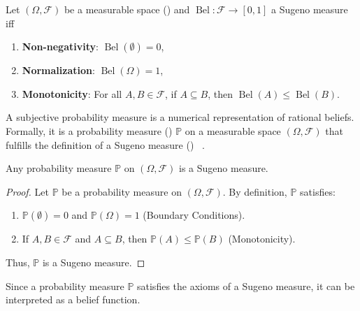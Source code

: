 \begin{definition}
	\label{def:sugeno_measure}
	Let $(\Omega, \mathcal{F})$ be a measurable space () and $\operatorname{Bel}: \mathcal{F} \to [0, 1]$ a Sugeno measure iff~\cite{shafer1987}
	\begin{enumerate}
		\item \textbf{Non-negativity}: $\operatorname{Bel}(\emptyset) = 0$,
		\item \textbf{Normalization}: $\operatorname{Bel}(\Omega) = 1$,
		\item \textbf{Monotonicity}: For all $A, B \in \mathcal{F}$, if $A \subseteq B$, then $\operatorname{Bel}(A) \leq \operatorname{Bel}(B)$.
	\end{enumerate}
\end{definition}

\begin{definition}
	\label{def:subjective_probability}
	A subjective probability measure is a numerical representation of rational beliefs. Formally, it is a probability measure () $\mathbb{P}$ on a measurable space $(\Omega, \mathcal{F})$ that fulfills the definition of a Sugeno measure () ~\cite{shafer1987,hoff2009first}.
\end{definition}

\begin{theorem}
	Any probability measure $\mathbb{P}$ on $(\Omega, \mathcal{F})$ is a Sugeno measure.
\end{theorem}
\begin{proof}
	Let $\mathbb{P}$ be a probability measure on $(\Omega, \mathcal{F})$. By definition, $\mathbb{P}$ satisfies:
	\begin{enumerate}
		\item $\mathbb{P}(\emptyset) = 0$ and $\mathbb{P}(\Omega) = 1$ (Boundary Conditions).
		\item If $A, B \in \mathcal{F}$ and $A \subseteq B$, then $\mathbb{P}(A) \leq \mathbb{P}(B)$ (Monotonicity).
	\end{enumerate}
	Thus, $\mathbb{P}$ is a Sugeno measure.
\end{proof}

\begin{corollary}
	Since a probability measure $\mathbb{P}$ satisfies the axioms of a Sugeno measure, it can be interpreted as a belief function.
\end{corollary}


